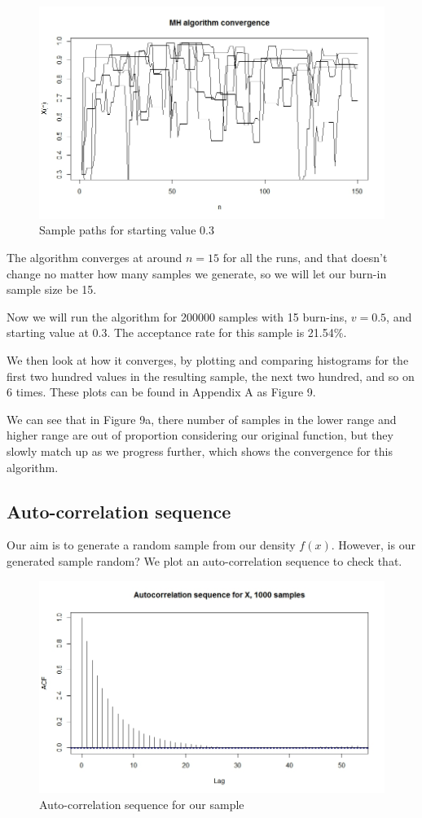 \documentclass[11pt, a4paper]{article}
\begin{document}
\begin{figure}[H]
\centering
	\includegraphics[scale=0.4]{3conv2.jpeg}
\caption{Sample paths for starting value 0.3}
\end{figure}

The algorithm converges at around $n=15$ for all the runs, and that doesn't change no matter how many samples we generate, so we will let our burn-in sample size be 15.

Now we will run the algorithm for 200000 samples with 15 burn-ins, $v=0.5$, and starting value at 0.3. The acceptance rate for this sample is 21.54\%. 

We then look at how it converges, by plotting and comparing histograms for the first two hundred values in the resulting sample, the next two hundred, and so on 6 times. These plots can be found in Appendix A as Figure 9.

We can see that in Figure 9a, there number of samples in the lower range and higher range are out of proportion considering our original function, but they slowly match up as we progress further, which shows the convergence for this algorithm.

\subsection{Auto-correlation sequence}
Our aim is to generate a random sample from our density $f(x)$. However, is our generated sample random? We plot an auto-correlation sequence to check that.
\begin{figure}[H]
\centering
	\includegraphics[scale=0.4]{3acf1.jpeg}
\caption{Auto-correlation sequence for our sample}
\end{figure}
\end{document}
